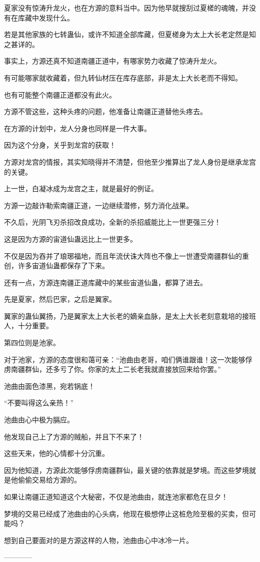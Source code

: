 \begin{this_body}
夏家没有惊涛升龙火，也在方源的意料当中。因为他早就搜刮过夏槎的魂魄，并没有在库藏中发现什么。

若是其他家族的七转蛊仙，或许不知道全部库藏，但夏槎身为太上大长老定然是知之甚详的。

事实上，方源还真不知道南疆正道中，有哪家势力收藏了惊涛升龙火。

有可能哪家就收藏着，但九转仙材压在库存底部，非是太上大长老而不得知。

也有可能整个南疆正道都没有此火。

方源不管这些，这种头疼的问题，他准备让南疆正道替他头疼去。

在方源的计划中，龙人分身也同样是一件大事。

因为这个分身，关乎到龙宫的获取！

方源对龙宫的情报，其实知晓得并不清楚，但他至少推算出了龙人身份是继承龙宫的关键。

上一世，白凝冰成为龙宫之主，就是最好的例证。

方源一边敲诈勒索南疆正道，一边继续潜修，努力消化战果。

不久后，光阴飞刃杀招改良成功，全新的杀招威能比上一世更强三分！

这是因为方源的宙道仙蛊远比上一世更多。

不仅是因为吞并了琅琊福地，而且年流伏诛大阵也不像上一世遭受南疆群仙的重创，许多宙道仙蛊都保存了下来。

还有一点，方源连南疆正道库藏中的某些宙道仙蛊，都算了进去。

先是夏家，然后巴家，之后是翼家。

翼家的蛊仙翼扬，乃是翼家太上大长老的嫡亲血脉，是太上大长老刻意栽培的接班人，十分重要。

第四位则是池家。

对于池家，方源的态度很和蔼可亲：“池曲由老哥，咱们俩谁跟谁！这一次能够俘虏南疆群仙，还多亏了你。你家的太上二长老我就直接放回来给你罢。”

池曲由面色漆黑，宛若锅底！

“不要叫得这么亲热！”

池曲由心中极为膈应。

他发现自己上了方源的贼船，并且下不来了！

这些天来，他的心情都十分沉重。

因为他知道，方源此次能够俘虏南疆群仙，最关键的依靠就是梦境。而这些梦境就是他偷偷交易给方源的。

如果让南疆正道知道这个大秘密，不仅是池曲由，就连池家都危在旦夕！

梦境的交易已经成了池曲由的心头病，他现在极想停止这桩危险至极的买卖，但可能吗？

想到自己要面对的是方源这样的人物，池曲由心中冰冷一片。

------------

\end{this_body}

